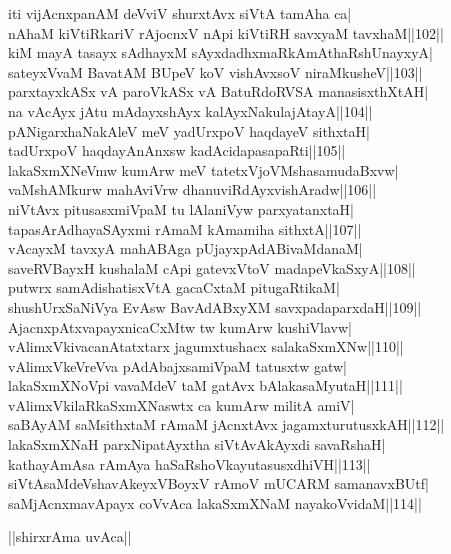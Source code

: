 \documentclass{article}
\begin{document}
iti vijAcnxpanAM deVviV shurxtAvx siVtA tamAha ca|\\
nAhaM kiVtiRkariV rAjocnxV nApi kiVtiRH savxyaM tavxhaM||102||\\
kiM mayA tasayx sAdhayxM sAyxdadhxmaRkAmAthaRshUnayxyA|\\
sateyxVvaM BavatAM BUpeV koV vishAvxsoV niraMkusheV||103||\\
parxtayxkASx vA paroVkASx vA BatuRdoRVSA manasisxthXtAH|\\
na vAcAyx jAtu mAdayxshAyx kalAyxNakulajAtayA||104||\\
pANigarxhaNakAleV meV yadUrxpoV haqdayeV sithxtaH|\\
tadUrxpoV haqdayAnAnxsw kadAcidapasapaRti||105||\\
lakaSxmXNeVmw kumArw meV tatetxVjoVMshasamudaBxvw|\\
vaMshAMkurw mahAviVrw dhanuviRdAyxvishAradw||106||\\
niVtAvx pitusasxmiVpaM tu lAlaniVyw parxyatanxtaH|\\
tapasArAdhayaSAyxmi rAmaM kAmamiha sithxtA||107||\\
vAcayxM tavxyA mahABAga pUjayxpAdABivaMdanaM|\\
saveRVBayxH kushalaM cApi gatevxVtoV madapeVkaSxyA||108||\\
putwrx samAdishatisxVtA gacaCxtaM pitugaRtikaM|\\
shushUrxSaNiVya EvAsw BavAdABxyXM savxpadaparxdaH||109||\\
AjacnxpAtxvapayxnicaCxMtw tw kumArw kushiVlavw|\\
vAlimxVkivacanAtatxtarx jagumxtushacx salakaSxmXNw||110||\\
vAlimxVkeVreVva pAdAbajxsamiVpaM tatusxtw gatw|\\
lakaSxmXNoVpi vavaMdeV taM gatAvx bAlakasaMyutaH||111||\\
vAlimxVkilaRkaSxmXNaswtx ca kumArw militA amiV|\\
saBAyAM saMsithxtaM rAmaM jAcnxtAvx jagamxturutusxkAH||112||\\
lakaSxmXNaH parxNipatAyxtha siVtAvAkAyxdi savaRshaH|\\
kathayAmAsa rAmAya haSaRshoVkayutasusxdhiVH||113||\\
siVtAsaMdeVshavAkeyxVBoyxV rAmoV mUCARM samanavxBUtf|\\
saMjAcnxmavApayx coVvAca lakaSxmXNaM nayakoVvidaM||114||\\

\begin{center}
||shirxrAma uvAca||
\end{center}
\end{document}
